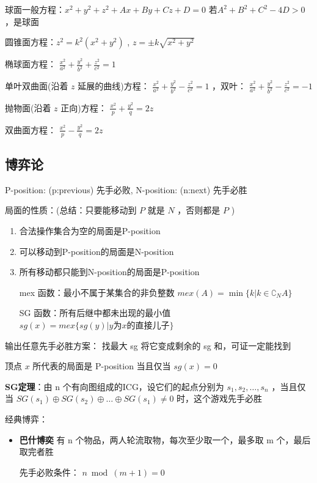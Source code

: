 \documentclass[twocolumn,10pt]{ctexart}
\begin{document}
\begin{notebox}
球面一般方程：$x^2+y^2+z^2+Ax+By+Cz+D=0$ 若$A^2+B^2+C^2-4D>0$，是球面

圆锥面方程：$z^2=k^2(x^2+y^2)$ , $z=\pm k\sqrt{x^2+y^2}$

椭球面方程： $\frac{x^2}{a^2}+\frac{y^2}{b^2}+\frac{z^2}{c^2}=1$

单叶双曲面(沿着 $z$ 延展的曲线)方程： $\frac{x^2}{a^2}+\frac{y^2}{b^2}-\frac{z^2}{c^2}=1$ ，双叶： $\frac{x^2}{a^2}+\frac{y^2}{b^2}-\frac{z^2}{c^2}=-1$

抛物面(沿着 $z$ 正向)方程： $\frac{x^2}p+\frac{y^2}q=2z$

双曲面方程： $\frac{x^2}p-\frac{y^2}q=2z$
\end{notebox}

\subsection{博弈论}

P-position: (p:previous) 先手必败,  N-position: (n:next) 先手必胜

局面的性质：(总结：只要能移动到 $P$ 就是 $N$ ，否则都是 $P$ )

\begin{enumerate}
\item 合法操作集合为空的局面是P-position
\item 可以移动到P-position的局面是N-position
\item 所有移动都只能到N-position的局面是P-position

mex 函数：最小不属于某集合的非负整数 $mex(A)=\min\{k|k\in\complement_NA\}$

SG 函数：所有后继中都未出现的最小值 $sg(x)=mex\{sg(y)|y\text{为}x\text{的直接儿子}\}$
\end{enumerate}

\begin{notebox}
输出任意先手必胜方案： 找最大 sg 将它变成剩余的 sg 和，可证一定能找到
\end{notebox}

顶点 $x$ 所代表的局面是 P-position 当且仅当 $sg(x)=0$

\textbf{SG定理}：由 n 个有向图组成的ICG，设它们的起点分别为 $s_1,s_2,\dots,s_n$ ，当且仅当 $SG(s_1)\oplus SG(s_2)\oplus\dots\oplus SG(s_1)\ne0$ 时，这个游戏先手必胜

经典博弈：

\begin{itemize}
\item \textbf{巴什博奕} 有 n 个物品，两人轮流取物，每次至少取一个，最多取 m 个，最后取完者胜

先手必败条件： $n\bmod (m+1)=0$
\end{itemize}
\end{document}
